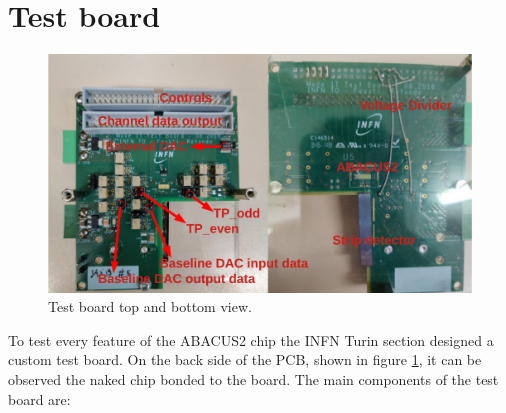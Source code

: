 \section{Test board}\label{testboard}
\begin{figure}[H]
	\centering
	\includegraphics[width=0.9\linewidth]{IMG/ch5/TESTBOARD}
	\caption{Test board top and bottom view.}
	\label{fig:testboard}
\end{figure}
To test every feature of the ABACUS2 chip the INFN Turin section designed a custom test board.
On the back side of the PCB, shown in figure \ref{fig:testboard}, it can be observed the naked chip bonded to the board.
The main components of the test board are:
